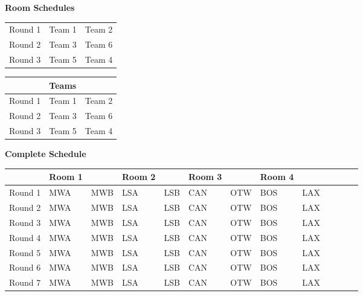 \documentclass[a4paper,12pt]{report}
\begin{document}
\pagebreak

\begin{center}
\begin{huge}
\textbf{Room Schedules}
\end{huge}

\vspace{36pt}

\begin{tabular}{l|ll}
\hline
Round 1 & Team 1 & Team 2 \\
Round 2 & Team 3 & Team 6 \\
Round 3 & Team 5 & Team 4 \\
\end{tabular}

\vspace{30pt}

\begin{tabular}{l|ll}
& Teams & \\
\hline
Round 1 & Team 1 & Team 2 \\
Round 2 & Team 3 & Team 6 \\
Round 3 & Team 5 & Team 4 \\
\end{tabular}

\end{center}

\pagebreak

\begin{center}
\begin{huge}
\textbf{Complete Schedule}
\end{huge}

\vspace{36pt}

\begin{tabular}{l|ll|ll|ll|ll|ll|ll}
 & Room 1 && Room 2 && Room 3 && Room 4 \\
\hline
Round 1 & MWA & MWB & LSA & LSB & CAN & OTW & BOS & LAX \\
Round 2 & MWA & MWB & LSA & LSB & CAN & OTW & BOS & LAX \\
Round 3 & MWA & MWB & LSA & LSB & CAN & OTW & BOS & LAX \\
Round 4 & MWA & MWB & LSA & LSB & CAN & OTW & BOS & LAX \\
Round 5 & MWA & MWB & LSA & LSB & CAN & OTW & BOS & LAX \\
Round 6 & MWA & MWB & LSA & LSB & CAN & OTW & BOS & LAX \\
Round 7 & MWA & MWB & LSA & LSB & CAN & OTW & BOS & LAX \\
\end{tabular}

\end{center}
\end{document}

